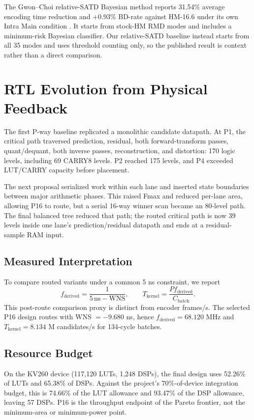 \documentclass[journal]{IEEEtran}
\begin{document}
The Gwon--Choi relative-SATD Bayesian method reports 31.54\% average encoding
time reduction and +0.93\% BD-rate against HM-16.6 under its own Intra Main
condition \cite{gwon2019}. It starts from stock-HM RMD modes and includes a
minimum-risk Bayesian classifier. Our relative-SATD baseline instead starts
from all 35 modes and uses threshold counting only, so the published result is
context rather than a direct comparison.

\section{RTL Evolution from Physical Feedback}
The first P-way baseline replicated a monolithic candidate datapath. At P1,
the critical path traversed prediction, residual, both forward-transform
passes, quant/dequant, both inverse passes, reconstruction, and distortion:
170 logic levels, including 69 CARRY8 levels. P2 reached 175 levels, and P4
exceeded LUT/CARRY capacity before placement.

The next proposal serialized work within each lane and inserted state
boundaries between major arithmetic phases. This raised Fmax and reduced
per-lane area, allowing P16 to route, but a serial 16-way winner scan became an
80-level path. The final balanced tree reduced that path; the routed critical
path is now 39 levels inside one lane's prediction/residual datapath and ends
at a residual-sample RAM input.

\subsection{Measured Interpretation}
To compare routed variants under a common 5 ns constraint, we report
\begin{equation}
 f_{\mathrm{derived}}=\frac{1}{5\,\mathrm{ns}-\mathrm{WNS}},\qquad
 T_{\mathrm{kernel}}=\frac{P f_{\mathrm{derived}}}{C_{\mathrm{batch}}}.
\end{equation}
This post-route comparison proxy is distinct from encoder frames/s. The
selected P16 design routes with WNS $=-9.680$ ns, hence
$f_{\mathrm{derived}}=68.120$ MHz and $T_{\mathrm{kernel}}=8.134$ M
candidates/s for 134-cycle batches.

\subsection{Resource Budget}
On the KV260 device (117,120 LUTs, 1,248 DSPs), the final design uses 52.26\%
of LUTs and 65.38\% of DSPs. Against the project's 70\%-of-device integration
budget, this is 74.66\% of the LUT allowance and 93.47\% of the DSP allowance,
leaving 57 DSPs. P16 is the throughput endpoint of the Pareto frontier, not the
minimum-area or minimum-power point.
\end{document}
